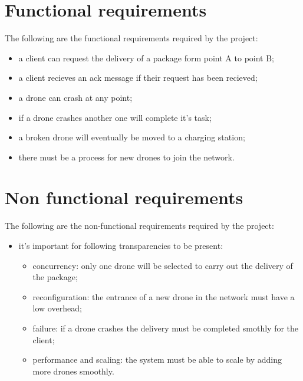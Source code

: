 \documentclass[a4paper, oneside]{memoir}
\begin{document}
\section{Functional requirements}
The following are the functional requirements required by the project:
\begin{itemize}
\item a client can request the delivery of a package form point A to point B;
\item a client recieves an ack message if their request has been recieved;
\item a drone can crash at any point;
\item if a drone crashes another one will complete it's task;
\item a broken drone will eventually be moved to a charging station;
\item there must be a process for new drones to join the network.
\end{itemize}
 
\section{Non functional requirements}
The following are the non-functional requirements required by the project:
\begin{itemize}
\item it's important for following transparencies to be present:
	\begin{itemize}
	\item concurrency: only one drone will be selected to carry out the delivery of the package;
	\item reconfiguration: the entrance of a new drone in the network must have a low overhead;
	\item failure: if a drone crashes the delivery must be completed smothly for the client;
	\item performance and scaling: the system must be able to scale by adding more drones smoothly.
	\end{itemize}
\end{itemize}

\end{document}
